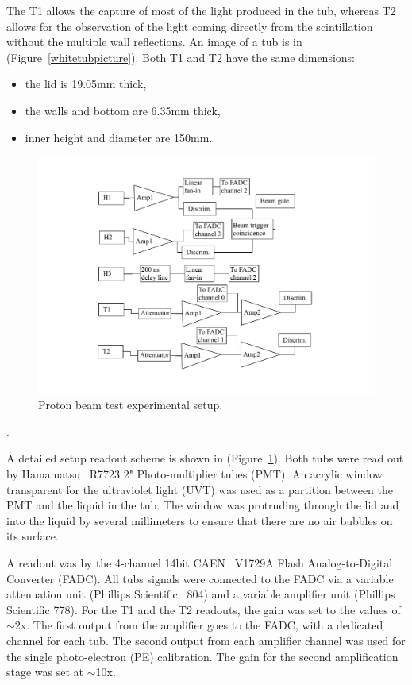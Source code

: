 \documentclass[preprint,12pt]{elsarticle}
\begin{document}
The T1 allows the capture of most of the light produced in the tub, whereas T2 allows for the observation of the light coming directly from the scintillation without the multiple wall reflections. An image of a tub is in (Figure~\ref{whitetubpicture}). Both T1 and T2 have the same dimensions:

\begin{itemize}
	\item the lid is 19.05mm thick,
	\item the walls and bottom are 6.35mm thick,
	\item inner height and diameter are 150mm.
\end{itemize}

\begin{figure}[ht]
\centering
\includegraphics[width=130mm]{beamtestschematics.pdf}
\caption{Proton beam test experimental setup.} \label{experimentalsetup2}
\end{figure}.

A detailed setup readout scheme is shown in (Figure~\ref{experimentalsetup2}). Both tubs were read out by Hamamatsu~\cite{hamamatsu} R7723 2"  Photo-multiplier tubes (PMT). An acrylic window transparent for the ultraviolet light (UVT) was used as a partition between the PMT and the liquid in the tub. The window was protruding through the lid and into the liquid by several millimeters to ensure that there are no air bubbles on its surface.

A readout was by the 4-channel 14bit CAEN~\cite{caen} V1729A Flash Analog-to-Digital Converter (FADC). All tubs signals were connected to the FADC via a variable attenuation unit (Phillips Scientific~\cite{phillips} 804) and a variable amplifier unit (Phillips Scientific 778). For the T1 and the T2 readouts, the gain was set to the values of $\sim$2x. The first output from the amplifier goes to the FADC, with a dedicated channel for each tub. The second output from each amplifier channel was used for the single photo-electron (PE) calibration. The gain for the second amplification stage was set at $\sim$10x.
\end{document}
